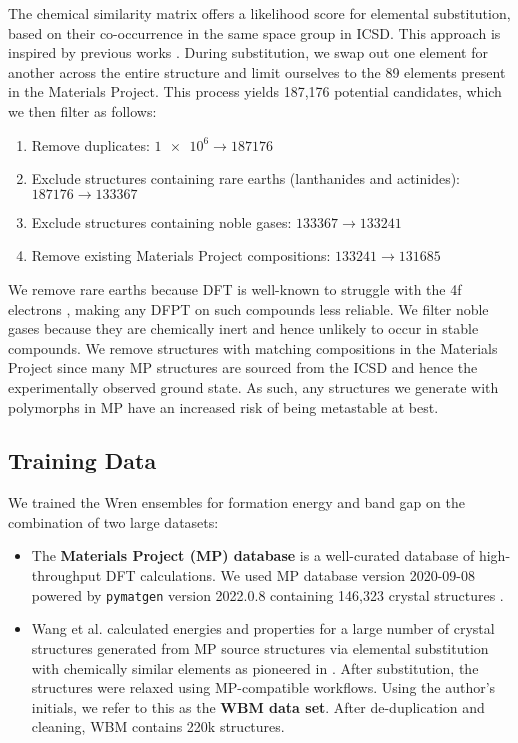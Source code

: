 \documentclass{article}
\begin{document}
The chemical similarity matrix offers a likelihood score for elemental substitution, based on their co-occurrence in the same space group in ICSD.
This approach is inspired by previous works \cite{glawe_optimal_2016,goodall_rapid_2022}.
During substitution, we swap out one element for another across the entire structure and limit ourselves to the 89 elements present in the Materials Project.
This process yields 187,176 potential candidates, which we then filter as follows:

\begin{enumerate}
    \item Remove duplicates: $\num{1e6} \to \num{187176}$
    \item Exclude structures containing rare earths (lanthanides and actinides): $\num{187176} \to \num{133367}$
    \item Exclude structures containing noble gases: $\num{133367} \to \num{133241}$
    \item Remove existing Materials Project compositions: $\num{133241} \to \num{131685}$
\end{enumerate}

We remove rare earths because DFT is well-known to struggle with the 4f electrons \cite{soderlind_groundstate_2014}, making any DFPT on such compounds less reliable. We filter noble gases because they are chemically inert and hence unlikely to occur in stable compounds. We remove structures with matching compositions in the Materials Project since many MP structures are sourced from the ICSD and hence the experimentally observed ground state.
As such, any structures we generate with polymorphs in MP have an increased risk of being metastable at best.

\subsection{Training Data}
\label{sec:training-data}

We trained the Wren ensembles for formation energy and band gap on the combination of two large datasets:

\begin{itemize}
    \item The \textbf{Materials Project (MP) database} \cite{jain_commentary_2013} is a well-curated database of high-throughput DFT calculations.
          We used MP database version 2020-09-08 powered by \texttt{pymatgen} version 2022.0.8 containing 146,323 crystal structures \cite{persson_materials_2022}.
    \item Wang et al. \cite{wang_predicting_2021} calculated energies and properties for a large number of crystal structures generated from MP source structures via elemental substitution with chemically similar elements as pioneered in \cite{glawe_optimal_2016}.
          After substitution, the structures were relaxed using MP-compatible workflows.
          Using the author's initials, we refer to this as the \textbf{WBM data set}.
          After de-duplication and cleaning, WBM contains 220k structures.
\end{itemize}
\end{document}
